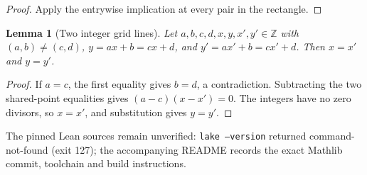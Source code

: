 \documentclass[11pt]{article}
\newtheorem{leanlemma}{Lemma}
\newcommand{\1}{\mathbf 1}
\begin{document}
\begin{proof}
Apply the entrywise implication at every pair in the rectangle.
\end{proof}
\begin{samepage}
\begin{leanlemma}[Two integer grid lines]
Let $a,b,c,d,x,y,x',y'\in\mathbb Z$ with $(a,b)\ne(c,d)$, $y=ax+b=cx+d$, and $y'=ax'+b=cx'+d$. Then $x=x'$ and $y=y'$.
\end{leanlemma}
\end{samepage}
\begin{proof}
If $a=c$, the first equality gives $b=d$, a contradiction. Subtracting the two shared-point equalities gives $(a-c)(x-x')=0$. The integers have no zero divisors, so $x=x'$, and substitution gives $y=y'$.
\end{proof}

The pinned Lean sources remain unverified: \texttt{lake --version} returned command-not-found (exit 127); the accompanying README records the exact Mathlib commit, toolchain and build instructions.



\end{document}
